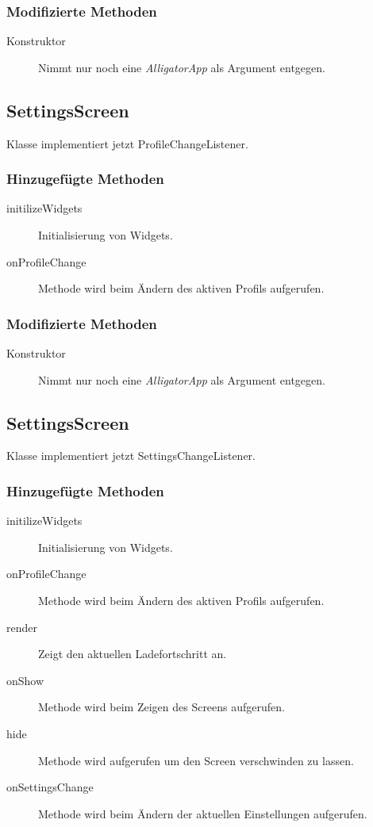 \subsubsection{Modifizierte Methoden}
\begin{description}
\item[Konstruktor]
Nimmt nur noch eine \emph{AlligatorApp} als Argument entgegen.

\end{description}


\subsection{SettingsScreen}
Klasse implementiert jetzt ProfileChangeListener.
\subsubsection{Hinzugefügte Methoden}
\begin{description}
\item[initilizeWidgets]
Initialisierung von Widgets.
\item[onProfileChange]
Methode wird beim Ändern des aktiven Profils aufgerufen.

\end{description}

\subsubsection{Modifizierte Methoden}
\begin{description}
\item[Konstruktor]
Nimmt nur noch eine \emph{AlligatorApp} als Argument entgegen.

\end{description}


\subsection{SettingsScreen}
Klasse implementiert jetzt SettingsChangeListener.
\subsubsection{Hinzugefügte Methoden}
\begin{description}
\item[initilizeWidgets]
Initialisierung von Widgets.
\item[onProfileChange]
Methode wird beim Ändern des aktiven Profils aufgerufen.
\item[render]
Zeigt den aktuellen Ladefortschritt an.
\item[onShow]
Methode wird beim Zeigen des Screens aufgerufen.
\item[hide]
Methode wird aufgerufen um den Screen verschwinden zu lassen.
\item[onSettingsChange]
Methode wird beim Ändern der aktuellen Einstellungen aufgerufen.

\end{description}

